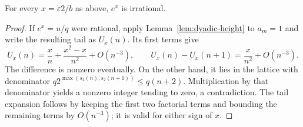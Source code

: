 \begin{lemma}\label{lem:dyadic-exp}
For every $x=\varepsilon 2/b$ as above, $e^x$ is irrational.
\end{lemma}
\begin{proof}
If $e^x=u/q$ were rational, apply Lemma~\ref{lem:dyadic-height} to
$a_m=1$ and write the resulting tail as $U_x(n)$. Its first terms give
\[
 U_x(n)=\frac{x}{n}+\frac{x^2-x}{n^2}+O(n^{-3}),
 \qquad U_x(n)-U_x(n+1)=\frac{x}{n^2}+O(n^{-3}).
\]
The difference is nonzero eventually. On the other hand, it lies
in the lattice with denominator
$q2^{\max(s_2(n),s_2(n+1))}\leq q(n+2)$.
Multiplication by that denominator yields a nonzero integer tending
to zero, a contradiction. The tail expansion follows by keeping the
first two factorial terms and bounding the remaining terms by
$O(n^{-3})$; it is valid for either sign of $x$.
\end{proof}

